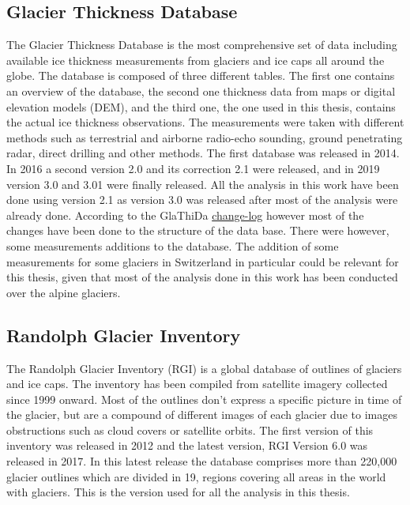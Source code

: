 \subsection{Glacier Thickness Database}
The Glacier Thickness Database \citep{GlaThiDa2014} is the most comprehensive set of data including available ice thickness measurements from glaciers and ice caps all around the globe. The database is composed of three different tables. The first one contains an overview of the database, the second one thickness data from maps or digital elevation models (DEM), and the third one, the one used in this thesis, contains the actual ice thickness observations. The measurements were taken with different methods such as terrestrial and airborne radio-echo sounding, ground penetrating radar, direct drilling and other methods. The first database was released in 2014. In 2016 a second version 2.0 and its correction 2.1 were released, and in 2019 version 3.0 and 3.01 were finally released. All the analysis in this work have been done using version 2.1 as version 3.0 was released after most of the analysis were already done. According to the GlaThiDa \href{https://github.com/ezwelty/glathida/blob/master/CHANGELOG.md}{change-log} however most of the changes have been done to the structure of the data base. There were however, some measurements additions to the database. The addition of some measurements for some glaciers in Switzerland in particular could be relevant for this thesis, given that most of the analysis done in this work has been conducted over the alpine glaciers. 

\subsection{Randolph Glacier Inventory}
The Randolph Glacier Inventory (RGI) \citep{RGI2014} is a global database of outlines of glaciers and ice caps. The inventory has been compiled from satellite imagery collected since 1999 onward. Most of the outlines don't express a specific picture in time of the glacier, but are a compound of different images of each glacier due to images obstructions such as cloud covers or satellite orbits. The first version of this inventory was released in 2012 and the latest version, RGI Version 6.0 was released in 2017. In this latest release the database comprises more than 220,000 glacier outlines which are divided in 19, regions covering all areas in the world with glaciers. This is the version used for all the analysis in this thesis. 


